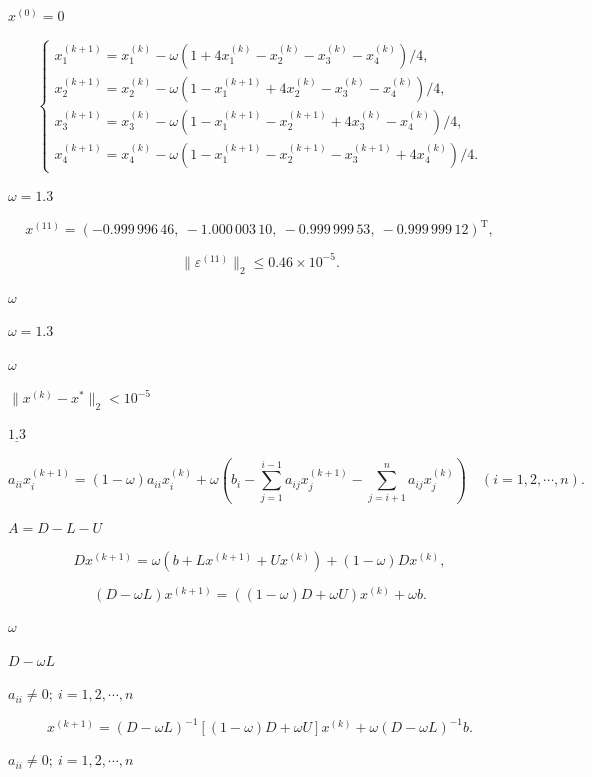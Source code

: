 \documentclass[UTF8,fontset=fandol]{ctexart}
\begin{document}
$x^{(0)}=0$\par

\[
\begin{cases}
x_1^{(k+1)}=x_1^{(k)}-\omega(1+4x_1^{(k)}-x_2^{(k)}-x_3^{(k)}-x_4^{(k)})/4,\\
x_2^{(k+1)}=x_2^{(k)}-\omega(1-x_1^{(k+1)}+4x_2^{(k)}-x_3^{(k)}-x_4^{(k)})/4,\\
x_3^{(k+1)}=x_3^{(k)}-\omega(1-x_1^{(k+1)}-x_2^{(k+1)}+4x_3^{(k)}-x_4^{(k)})/4,\\
x_4^{(k+1)}=x_4^{(k)}-\omega(1-x_1^{(k+1)}-x_2^{(k+1)}-x_3^{(k+1)}+4x_4^{(k)})/4.
\end{cases}
\]

$\omega=1.3$\par

\[
x^{(11)}=(-0.999\,996\,46,\ -1.000\,003\,10,\ -0.999\,999\,53,\ -0.999\,999\,12)^{\mathrm T},
\]

\[
\|\varepsilon^{(11)}\|_2\leqslant0.46\times10^{-5}.
\]

$\omega$\par

$\omega=1.3$\par

$\omega$\par

$\|x^{(k)}-x^*\|_2<10^{-5}$\par

$\underline{1.3}$\par

\[
a_{ii}x_i^{(k+1)}=(1-\omega)a_{ii}x_i^{(k)}+\omega\left(b_i-\sum_{j=1}^{i-1}a_{ij}x_j^{(k+1)}-\sum_{j=i+1}^n a_{ij}x_j^{(k)}\right)\quad(i=1,2,\cdots,n).
\tag{8.4.7}
\]

$A=D-L-U$\par

\[
Dx^{(k+1)}=\omega(b+Lx^{(k+1)}+Ux^{(k)})+(1-\omega)Dx^{(k)},
\]

\[
(D-\omega L)x^{(k+1)}=((1-\omega)D+\omega U)x^{(k)}+\omega b.
\]

$\omega$\par

$D-\omega L$\par

$a_{ii}\neq0;\ i=1,2,\cdots,n$\par

\[
x^{(k+1)}=(D-\omega L)^{-1}[(1-\omega)D+\omega U]x^{(k)}+\omega(D-\omega L)^{-1}b.
\]

$a_{ii}\neq0;\ i=1,2,\cdots,n$\par
\end{document}
